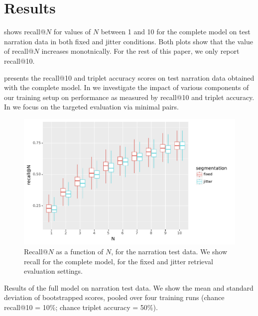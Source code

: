 \section{Results}
\label{sec:results}

 shows recall@$N$ for values of $N$
between 1 and 10 for the complete model on test narration data in both 
{\sc fixed} and {\sc jitter} conditions. Both plots show that the value of 
recall@$N$ increases monotnically. For the rest 
of this paper, we only report recall@10.

 presents the recall@10 and triplet accuracy
scores on test narration data obtained with the complete
model. In  we investigate the impact
of various components of our training setup on performance as measured
by recall@10 and triplet accuracy.  In  we
focus on the targeted evaluation via minimal pairs.



\begin{figure}[htb]
  \centering
  \includegraphics[width=\columnwidth]{results/recall_at_1_to_n_test.pdf}
  \caption{Recall@$N$ as a function of $N$, for the narration test
    data. We show recall for the complete model, for the {\sc fixed} and {\sc jitter}
    retrieval evaluation settings. }
  \label{fig:recall_at_1_to_n}
\end{figure}

\begin{table}[htb]
  
  \caption{Results of the full model on narration test
  	data. We show the mean and standard deviation of 
  	bootstrapped scores, pooled over four training runs
	(chance recall@10 = 10\%; chance triplet accuracy = 50\%).}
  \label{tab:test_scores}
\end{table}



